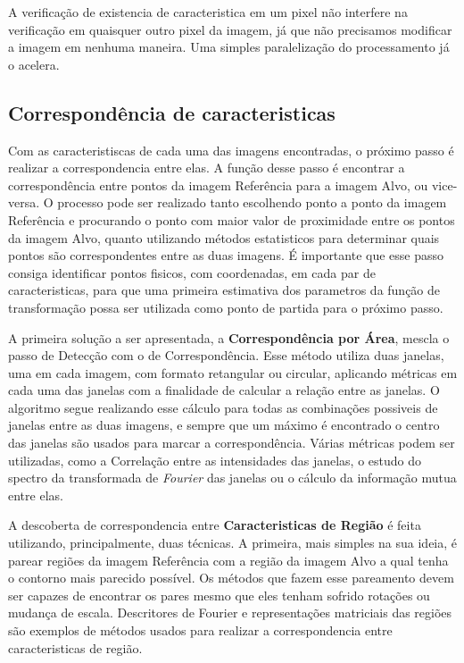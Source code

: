     A verificação de existencia de caracteristica em um pixel não interfere na verificação em quaisquer outro pixel da
imagem, já que não precisamos modificar a imagem em nenhuma maneira. Uma simples paralelização do processamento já o
acelera.

\subsection{Correspondência de caracteristicas}

    Com as caracteristiscas de cada uma das imagens encontradas, o próximo passo é realizar a correspondencia entre elas.
A função desse passo é encontrar a correspondência entre pontos da imagem Referência para a imagem Alvo, ou vice-versa. 
O processo pode ser realizado tanto escolhendo ponto a ponto da imagem Referência e procurando o ponto com maior valor 
de proximidade entre os pontos da imagem Alvo, quanto utilizando métodos estatisticos para determinar quais pontos são 
correspondentes entre as duas imagens. É importante que esse passo consiga identificar pontos fisicos, com coordenadas, 
em cada par de caracteristicas, para que uma primeira estimativa dos parametros da função de transformação possa ser 
utilizada como ponto de partida para o próximo passo.

    A primeira solução a ser apresentada, a \textbf{Correspondência por Área}, mescla o passo de Detecção com o de 
Correspondência. Esse método utiliza duas janelas, uma em cada imagem, com formato retangular ou circular, aplicando
métricas em cada uma das janelas com a finalidade de calcular a relação entre as janelas. O algoritmo segue realizando
esse cálculo para todas as combinações possiveis de janelas entre as duas imagens, e sempre que um máximo é encontrado
o centro das janelas são usados para marcar a correspondência. Várias métricas podem ser utilizadas, como a 
Correlação entre as intensidades das janelas, o estudo do spectro da transformada de \textit{Fourier} das janelas ou 
o cálculo da informação mutua entre elas.

    A descoberta de correspondencia entre \textbf{Caracteristicas de Região} é feita utilizando, principalmente, duas 
técnicas. A primeira, mais simples na sua ideia, é parear regiões da imagem Referência com a região da imagem Alvo a qual
tenha o contorno mais parecido possível. Os métodos que fazem esse pareamento devem ser capazes de encontrar os pares mesmo
que eles tenham sofrido rotações ou mudança de escala. Descritores de Fourier e representações matriciais das regiões são
exemplos de métodos usados para realizar a correspondencia entre caracteristicas de região.

